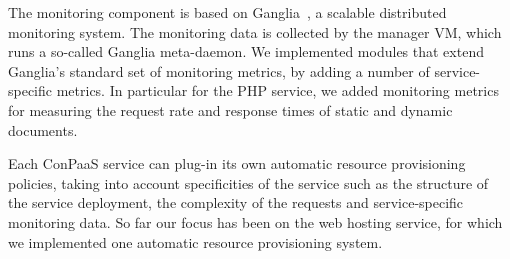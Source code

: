 
The monitoring component is based on Ganglia~\cite{ganglia}, a
scalable distributed monitoring system. The monitoring data is
collected by the manager VM, which runs a so-called Ganglia
meta-daemon. We implemented modules that extend Ganglia's standard set
of monitoring metrics, by adding a number of service-specific
metrics. In particular for the PHP service, we added monitoring
metrics for measuring the request rate and response times of static
and dynamic documents.


Each ConPaaS service can plug-in its own automatic resource
provisioning policies, taking into account specificities of the
service such as the structure of the service deployment, the
complexity of the requests and service-specific monitoring data. So
far our focus has been on the web hosting service, for which we
implemented one automatic resource provisioning system.




 

